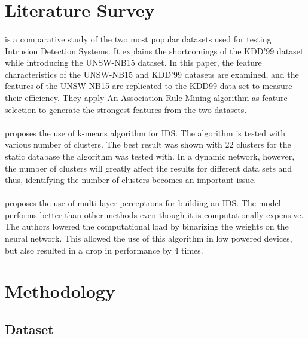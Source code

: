 \documentclass[a4paper,12pt]{article}
\begin{document}
	\section{Literature Survey}
	\paragraph{}
    \cite{unsw15} is a comparative study of the two most popular datasets used for testing Intrusion Detection Systems. It explains the shortcomings of the KDD'99 dataset while introducing the UNSW-NB15 dataset. In this paper, the feature characteristics of the UNSW-NB15 and KDD'99 datasets are examined, and the features of the UNSW-NB15 are replicated to the KDD99 data set to measure their efficiency. They apply An Association Rule Mining algorithm as feature selection to generate the strongest features from the two datasets.
    \paragraph{}
	\cite{dm15} proposes the use of k-means algorithm for IDS. The algorithm is tested with various number of clusters. The best result was shown with 22 clusters for the static database the algorithm was tested with. In a dynamic network, however, the number of clusters will greatly affect the results for different data sets and thus, identifying the number of clusters becomes an important issue.
	\paragraph{}
	\cite{mlp17} proposes the use of multi-layer perceptrons for building an IDS. The model performs better than other methods even though it is computationally expensive. The authors lowered the computational load by binarizing the weights on the neural network. This allowed the use of this algorithm in low powered devices, but also resulted in a drop in performance by 4 times.

	\section{Methodology}
        \subsection{Dataset}
\end{document}
